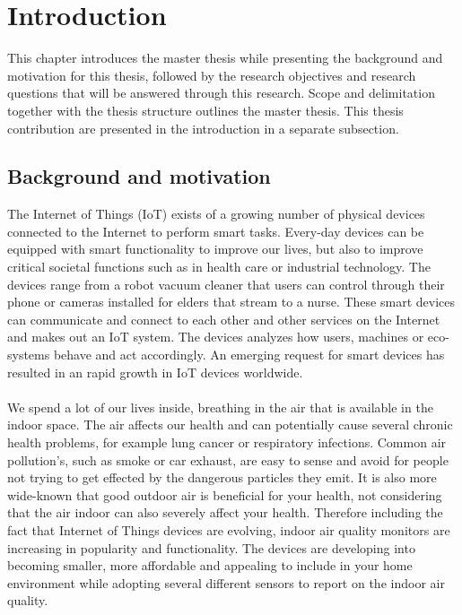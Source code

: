 \chapter{Introduction}
This chapter introduces the master thesis while presenting the background and motivation for this thesis, followed by the research objectives and research questions that will be answered through this research. Scope and delimitation together with the thesis structure outlines the master thesis. This thesis contribution are presented in the introduction in a separate subsection. 
\section{Background and motivation}
The Internet of Things (IoT) exists of a growing number of physical devices connected to the Internet to perform smart tasks. \cite{IoTSurveyAl-Fuqaha} Every-day devices can be equipped with smart functionality to improve our lives, but also to improve critical societal functions such as in health care or industrial technology. The devices range from a robot vacuum cleaner that users can control through their phone or cameras installed for elders that stream to a nurse. These smart devices can communicate and connect to each other and other services on the Internet and makes out an IoT system. The devices analyzes how users, machines or eco-systems behave and act accordingly. An emerging request for smart devices has resulted in an rapid growth in IoT devices worldwide. \cite{IoTAndPrivacy}
\\\\
We spend a lot of our lives inside, breathing in the air that is available in the indoor space. \cite{IndoorAirQualityMonitorIoT} The air affects our health and can potentially cause several chronic health problems, for example lung cancer or respiratory infections. \cite{IAQMonitorReview} Common air pollution's, such as smoke or car exhaust,  are easy to sense and avoid for people not trying to get effected by the dangerous particles they emit. It is also more wide-known that good outdoor air is beneficial for your health, not considering that the air indoor can also severely affect your health. \cite{IndoorAirQuality} Therefore including the fact that Internet of Things devices are evolving, indoor air quality monitors are increasing in popularity and functionality. \cite{SecurityAndDataIntInAQM} The devices are developing into becoming smaller, more affordable and appealing to include in your home environment while adopting several different sensors to report on the indoor air quality. 

